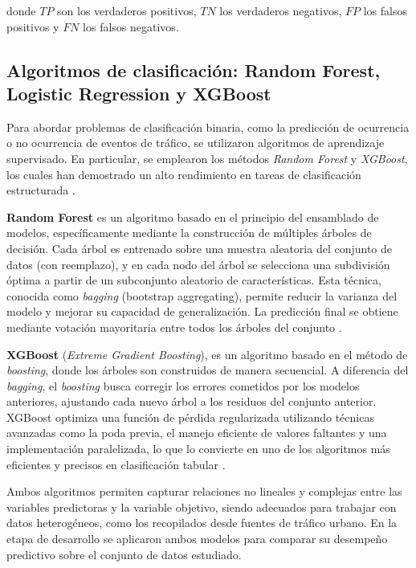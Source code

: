 \documentclass[12pt]{article}
\begin{document}
donde \( TP \) son los verdaderos positivos, \( TN \) los verdaderos negativos, \( FP \) los falsos positivos y \( FN \) los falsos negativos.

\subsection{Algoritmos de clasificación: Random Forest, Logistic Regression y XGBoost}

Para abordar problemas de clasificación binaria, como la predicción de ocurrencia o no ocurrencia de eventos de tráfico, se utilizaron algoritmos de aprendizaje supervisado. En particular, se emplearon los métodos \textit{Random Forest} y \textit{XGBoost}, los cuales han demostrado un alto rendimiento en tareas de clasificación estructurada \citep{friedman2001elements, chen2016xgboost}.

\textbf{Random Forest} es un algoritmo basado en el principio del ensamblado de modelos, específicamente mediante la construcción de múltiples árboles de decisión. Cada árbol es entrenado sobre una muestra aleatoria del conjunto de datos (con reemplazo), y en cada nodo del árbol se selecciona una subdivisión óptima a partir de un subconjunto aleatorio de características. Esta técnica, conocida como \textit{bagging} (bootstrap aggregating), permite reducir la varianza del modelo y mejorar su capacidad de generalización. La predicción final se obtiene mediante votación mayoritaria entre todos los árboles del conjunto \citep{breiman2001random}.

\textbf{XGBoost} (\textit{Extreme Gradient Boosting}), es un algoritmo basado en el método de \textit{boosting}, donde los árboles son construidos de manera secuencial. A diferencia del \textit{bagging}, el \textit{boosting} busca corregir los errores cometidos por los modelos anteriores, ajustando cada nuevo árbol a los residuos del conjunto anterior. XGBoost optimiza una función de pérdida regularizada utilizando técnicas avanzadas como la poda previa, el manejo eficiente de valores faltantes y una implementación paralelizada, lo que lo convierte en uno de los algoritmos más eficientes y precisos en clasificación tabular \citep{chen2016xgboost}.

Ambos algoritmos permiten capturar relaciones no lineales y complejas entre las variables predictoras y la variable objetivo, siendo adecuados para trabajar con datos heterogéneos, como los recopilados desde fuentes de tráfico urbano. En la etapa de desarrollo se aplicaron ambos modelos para comparar su desempeño predictivo sobre el conjunto de datos estudiado.
\end{document}
